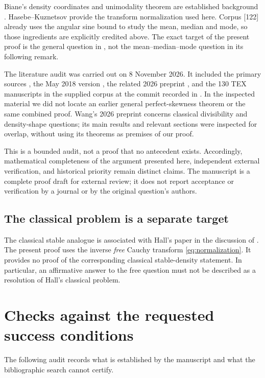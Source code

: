 \documentclass[11pt,a4paper]{article}
\theoremstyle{definition}
\theoremstyle{remark}
\numberwithin{equation}{section}
\begin{document}
Biane's density coordinates and unimodality theorem are established
background \cite{BP}. Hasebe--Kuznetsov \cite{HK} provide the transform
normalization used here. Corpus [122] \cite{Corpus122} already uses
the angular sine bound to study the mean, median and mode, so those
ingredients are explicitly credited above.
The exact target of the present proof is the general question in
\cite[Remark 13]{HSW}, not the mean--median--mode question in its
following remark.

The literature audit was carried out on 8 November 2026. It included
the primary sources \cite{BP,HK,HSW}, the May 2018 version
\cite{HSWpre}, the related 2026 preprint \cite{Wang2026}, and the
130 TEX manuscripts in the supplied corpus at the commit recorded
in \cite{Corpus122}. In the inspected material we did not locate an
earlier general perfect-skewness theorem or the same combined proof.
Wang's 2026 preprint concerns classical divisibility and density-shape
questions; its main results and relevant sections were inspected
for overlap, without using its theorems as premises of our proof.

This is a bounded audit, not a proof that no antecedent exists.
Accordingly, mathematical completeness of the argument presented
here, independent external verification, and historical priority
remain distinct claims. The manuscript is a complete proof draft
for external review; it does not report acceptance or verification
by a journal or by the original question's authors.

\subsection{The classical problem is a separate target}

The classical stable analogue is associated with Hall's paper
\cite{Hall} in the discussion of \cite[Remark 13]{HSW}.
The present proof uses the inverse \emph{free} Cauchy transform
\eqref{eq:normalization}. It provides no proof of the corresponding
classical stable-density statement. In particular, an affirmative
answer to the free question must not be described as a resolution
of Hall's classical problem.

\clearpage
\appendix
\section{Checks against the requested success conditions}
\label{sec:gates}

The following audit records what is established by the manuscript
and what the bibliographic search cannot certify.
\end{document}
